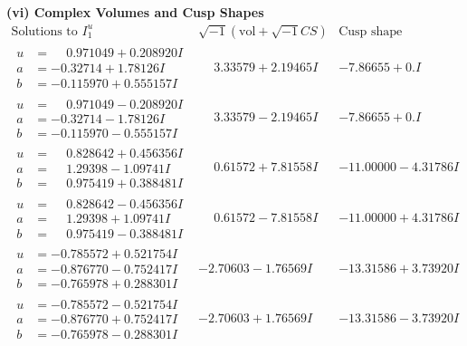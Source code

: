 \documentclass[1p]{elsarticle_modified}
\theoremstyle{definition}
\newcommand{\I}{\sqrt{-1}}
\begin{document}
\newpage\flushleft \textbf{(vi) Complex Volumes and Cusp Shapes}
$$\begin{array}{c|c|c}  
\text{Solutions to }I^u_{1}& \I (\text{vol} + \sqrt{-1}CS) & \text{Cusp shape}\\
 \hline 
\begin{aligned}
u &= \phantom{-}0.971049 + 0.208920 I \\
a &= -0.32714 + 1.78126 I \\
b &= -0.115970 + 0.555157 I\end{aligned}
 & \phantom{-}3.33579 + 2.19465 I & -7.86655 + 0. I\phantom{ +0.000000I} \\ \hline\begin{aligned}
u &= \phantom{-}0.971049 - 0.208920 I \\
a &= -0.32714 - 1.78126 I \\
b &= -0.115970 - 0.555157 I\end{aligned}
 & \phantom{-}3.33579 - 2.19465 I & -7.86655 + 0. I\phantom{ +0.000000I} \\ \hline\begin{aligned}
u &= \phantom{-}0.828642 + 0.456356 I \\
a &= \phantom{-}1.29398 - 1.09741 I \\
b &= \phantom{-}0.975419 + 0.388481 I\end{aligned}
 & \phantom{-}0.61572 + 7.81558 I & -11.00000 - 4.31786 I \\ \hline\begin{aligned}
u &= \phantom{-}0.828642 - 0.456356 I \\
a &= \phantom{-}1.29398 + 1.09741 I \\
b &= \phantom{-}0.975419 - 0.388481 I\end{aligned}
 & \phantom{-}0.61572 - 7.81558 I & -11.00000 + 4.31786 I \\ \hline\begin{aligned}
u &= -0.785572 + 0.521754 I \\
a &= -0.876770 - 0.752417 I \\
b &= -0.765978 + 0.288301 I\end{aligned}
 & -2.70603 - 1.76569 I & -13.31586 + 3.73920 I \\ \hline\begin{aligned}
u &= -0.785572 - 0.521754 I \\
a &= -0.876770 + 0.752417 I \\
b &= -0.765978 - 0.288301 I\end{aligned}
 & -2.70603 + 1.76569 I & -13.31586 - 3.73920 I \\ \hline\begin{aligned}

\end{aligned}
\end{array}$$
\end{document}

